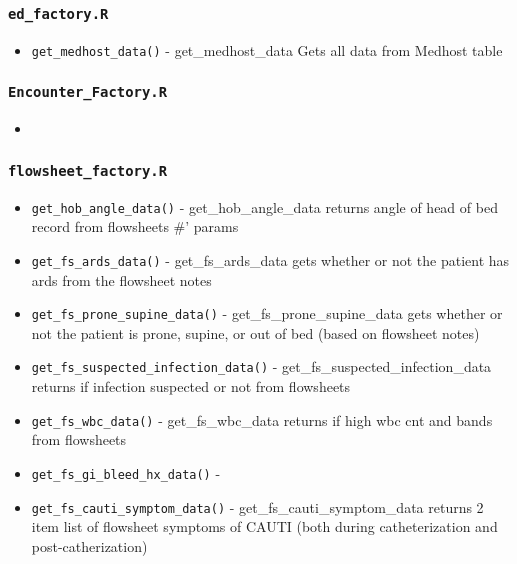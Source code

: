 \documentclass[
]{book}
\providecommand{\tightlist}{%
  \setlength{\itemsep}{0pt}\setlength{\parskip}{0pt}}
\begin{document}
\hypertarget{ed_factory.r}{%
\subsubsection{\texorpdfstring{\texttt{ed\_factory.R}}{ed\_factory.R}}\label{ed_factory.r}}

\begin{itemize}
\tightlist
\item
  \texttt{get\_medhost\_data()} - get\_medhost\_data Gets all data from Medhost table
\end{itemize}

\hypertarget{encounter_factory.r}{%
\subsubsection{\texorpdfstring{\texttt{Encounter\_Factory.R}}{Encounter\_Factory.R}}\label{encounter_factory.r}}

\begin{itemize}
\item
\end{itemize}

\hypertarget{flowsheet_factory.r}{%
\subsubsection{\texorpdfstring{\texttt{flowsheet\_factory.R}}{flowsheet\_factory.R}}\label{flowsheet_factory.r}}

\begin{itemize}
\tightlist
\item
  \texttt{get\_hob\_angle\_data()} - get\_hob\_angle\_data returns angle of head of bed record from flowsheets \#' \citet{param} params
\item
  \texttt{get\_fs\_ards\_data()} - get\_fs\_ards\_data gets whether or not the patient has ards from the flowsheet notes
\item
  \texttt{get\_fs\_prone\_supine\_data()} - get\_fs\_prone\_supine\_data gets whether or not the patient is prone, supine, or out of bed (based on flowsheet notes)
\item
  \texttt{get\_fs\_suspected\_infection\_data()} - get\_fs\_suspected\_infection\_data returns if infection suspected or not from flowsheets
\item
  \texttt{get\_fs\_wbc\_data()} - get\_fs\_wbc\_data returns if high wbc cnt and bands from flowsheets
\item
  \texttt{get\_fs\_gi\_bleed\_hx\_data()} -
\item
  \texttt{get\_fs\_cauti\_symptom\_data()} - get\_fs\_cauti\_symptom\_data returns 2 item list of flowsheet symptoms of CAUTI (both during catheterization and post-catherization)
\end{itemize}
\end{document}
